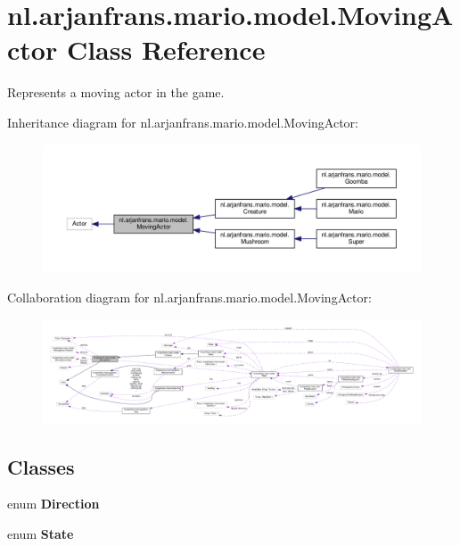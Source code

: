 \hypertarget{classnl_1_1arjanfrans_1_1mario_1_1model_1_1MovingActor}{}\section{nl.\+arjanfrans.\+mario.\+model.\+Moving\+Actor Class Reference}
\label{classnl_1_1arjanfrans_1_1mario_1_1model_1_1MovingActor}


Represents a moving actor in the game.  




Inheritance diagram for nl.\+arjanfrans.\+mario.\+model.\+Moving\+Actor\+:\nopagebreak
\begin{figure}[H]
\begin{center}
\leavevmode
\includegraphics[width=350pt]{classnl_1_1arjanfrans_1_1mario_1_1model_1_1MovingActor__inherit__graph}
\end{center}
\end{figure}


Collaboration diagram for nl.\+arjanfrans.\+mario.\+model.\+Moving\+Actor\+:
\nopagebreak
\begin{figure}[H]
\begin{center}
\leavevmode
\includegraphics[width=350pt]{classnl_1_1arjanfrans_1_1mario_1_1model_1_1MovingActor__coll__graph}
\end{center}
\end{figure}
\subsection*{Classes}
\begin{DoxyCompactItemize}
\item 
enum {\bfseries Direction}
\item 
enum {\bfseries State}
\end{DoxyCompactItemize}
